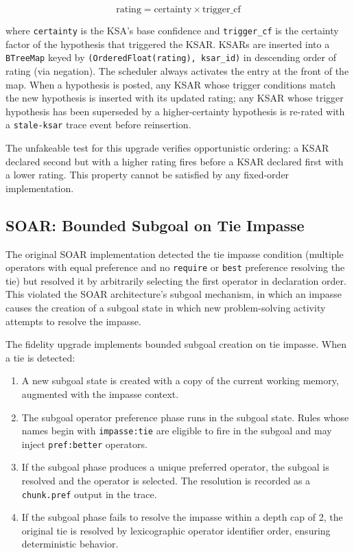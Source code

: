 \begin{equation}
\text{rating} = \text{certainty} \times \text{trigger\_cf}
\end{equation}

where \texttt{certainty} is the KSA's base confidence and \texttt{trigger\_cf} is the certainty factor of the hypothesis that triggered the KSAR. KSARs are inserted into a \texttt{BTreeMap} keyed by \texttt{(OrderedFloat(rating), ksar\_id)} in descending order of rating (via negation). The scheduler always activates the entry at the front of the map. When a hypothesis is posted, any KSAR whose trigger conditions match the new hypothesis is inserted with its updated rating; any KSAR whose trigger hypothesis has been superseded by a higher-certainty hypothesis is re-rated with a \texttt{stale-ksar} trace event before reinsertion.

The unfakeable test for this upgrade verifies opportunistic ordering: a KSAR declared second but with a higher rating fires before a KSAR declared first with a lower rating. This property cannot be satisfied by any fixed-order implementation.

\subsection{SOAR: Bounded Subgoal on Tie Impasse}

The original SOAR implementation detected the tie impasse condition (multiple operators with equal preference and no \texttt{require} or \texttt{best} preference resolving the tie) but resolved it by arbitrarily selecting the first operator in declaration order. This violated the SOAR architecture's subgoal mechanism, in which an impasse causes the creation of a subgoal state in which new problem-solving activity attempts to resolve the impasse.

The fidelity upgrade implements bounded subgoal creation on tie impasse. When a tie is detected:

\begin{enumerate}
\item A new subgoal state is created with a copy of the current working memory, augmented with the impasse context.
\item The subgoal operator preference phase runs in the subgoal state. Rules whose names begin with \texttt{impasse:tie} are eligible to fire in the subgoal and may inject \texttt{pref:better} operators.
\item If the subgoal phase produces a unique preferred operator, the subgoal is resolved and the operator is selected. The resolution is recorded as a \texttt{chunk.pref} output in the trace.
\item If the subgoal phase fails to resolve the impasse within a depth cap of 2, the original tie is resolved by lexicographic operator identifier order, ensuring deterministic behavior.
\end{enumerate}

